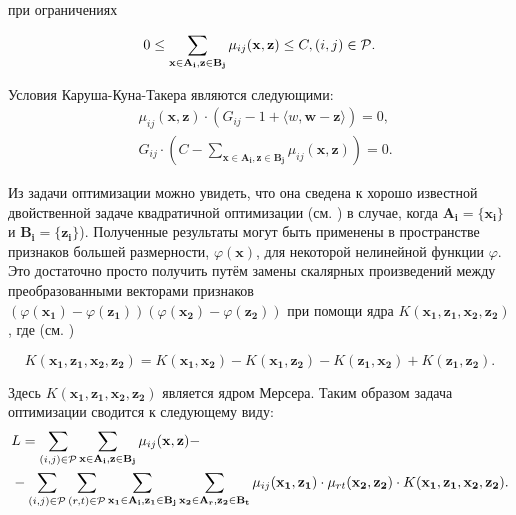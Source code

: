 \documentclass[12pt,a4paper,oneside]{article}
\begin{document}
\par
при ограничениях

\[
0 \leq \sum \limits_{\mathbf{x} \in \mathbf{A_i}, \mathbf{z} \in \mathbf{B_j}} \mu_{ij} (\mathbf{x}, \mathbf{z}) \leq C, (i, j) \in \mathcal{P}.
\]

\par
Условия Каруша-Куна-Такера являются следующими:
\mbox{}
\begin{eqnarray*}
&\mu_{ij}(\mathbf{x}, \mathbf{z}) \cdot (G_{ij} - 1 + \langle w, \mathbf{w} - \mathbf{z} \rangle) = 0,\\
&G_{ij} \cdot (C - \sum \limits_{\mathbf{x} \in \mathbf{A_i}, \mathbf{z} \in \mathbf{B_j}} \mu_{ij} (\mathbf{x}, \mathbf{z})) = 0.
\end{eqnarray*}

\par
Из задачи оптимизации можно увидеть, что она сведена к хорошо известной двойственной задаче квадратичной оптимизации (см. ) в случае, когда \(\mathbf{A_i} = \{\mathbf{x_i}\}\) и \(\mathbf{B_i} = \{\mathbf{z_i}\}\)). 
Полученные результаты могут быть применены в пространстве признаков большей размерности, \(\varphi(\mathbf{x})\), для некоторой нелинейной функции \(\varphi\). 
Это достаточно просто получить путём замены скалярных произведений между преобразованными векторами признаков \((\varphi(\mathbf{x_1}) - \varphi(\mathbf{z_1})) (\varphi(\mathbf{x_2}) - \varphi(\mathbf{z_2}))\) при помощи ядра \(K(\mathbf{x_1}, \mathbf{z_1}, \mathbf{x_2}, \mathbf{z_2})\), где (см. )

\[
K(\mathbf{x_1}, \mathbf{z_1}, \mathbf{x_2}, \mathbf{z_2}) = K(\mathbf{x_1}, \mathbf{x_2}) - K(\mathbf{x_1}, \mathbf{z_2}) - K(\mathbf{z_1}, \mathbf{x_2}) + K(\mathbf{z_1}, \mathbf{z_2}).
\]

\par
Здесь \(K(\mathbf{x_1}, \mathbf{z_1}, \mathbf{x_2}, \mathbf{z_2})\) является ядром Мерсера. 
Таким образом задача оптимизации сводится к следующему виду:
\mbox{}
\begin{eqnarray*}
&L = \sum \limits_{(i, j) \in \mathcal{P}} \sum \limits_{\mathbf{x} \in \mathbf{A_i}, \mathbf{z} \in \mathbf{B_j}} \mu_{ij} (\mathbf{x}, \mathbf{z}) - \\
&- \sum \limits_{(i, j) \in \mathcal{P}} \sum \limits_{(r, t) \in \mathcal{P}} \sum \limits_{\mathbf{x_1} \in \mathbf{A_i}, \mathbf{z_1} \in \mathbf{B_j}} \sum \limits_{\mathbf{x_2} \in \mathbf{A_r}, \mathbf{z_2} \in \mathbf{B_t}} \mu_{ij} (\mathbf{x_1}, \mathbf{z_1}) \cdot \mu_{rt} (\mathbf{x_2}, \mathbf{z_2}) \cdot K(\mathbf{x_1}, \mathbf{z_1}, \mathbf{x_2}, \mathbf{z_2}).
\end{eqnarray*}
\end{document}
